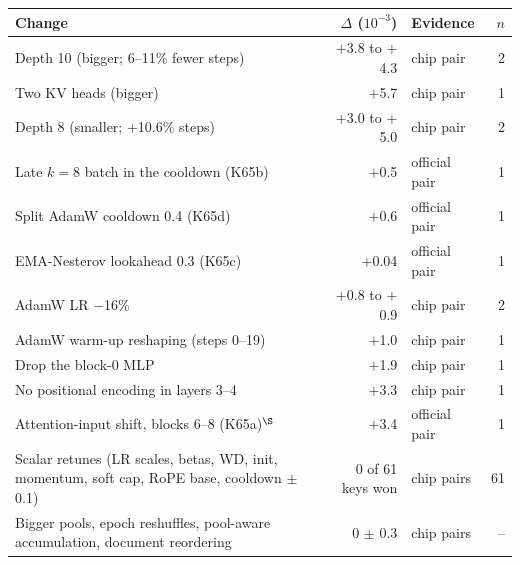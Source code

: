 {\small
\begin{tabular}{@{}p{7.6cm}rlr@{}}
\toprule
Change & $\Delta$ ($10^{-3}$) & Evidence & $n$ \\
\midrule
Depth 10 (bigger; 6--11\% fewer steps) & \ensuremath{+}3.8 to \ensuremath{+}4.3 & chip pair & 2 \\
Two KV heads (bigger) & \ensuremath{+}5.7 & chip pair & 1 \\
Depth 8 (smaller; +10.6\% steps) & \ensuremath{+}3.0 to \ensuremath{+}5.0 & chip pair & 2 \\
Late $k{=}8$ batch in the cooldown (K65b) & \ensuremath{+}0.5 & official pair & 1 \\
Split AdamW cooldown 0.4 (K65d) & \ensuremath{+}0.6 & official pair & 1 \\
EMA-Nesterov lookahead 0.3 (K65c) & \ensuremath{+}0.04 & official pair & 1 \\
AdamW LR $-$16\% & \ensuremath{+}0.8 to \ensuremath{+}0.9 & chip pair & 2 \\
AdamW warm-up reshaping (steps 0--19) & \ensuremath{+}1.0 & chip pair & 1 \\
Drop the block-0 MLP & \ensuremath{+}1.9 & chip pair & 1 \\
No positional encoding in layers 3--4 & \ensuremath{+}3.3 & chip pair & 1 \\
Attention-input shift, blocks 6--8 (K65a)$^{\S}$ & \ensuremath{+}3.4 & official pair & 1 \\
Scalar retunes (LR scales, betas, WD, init, momentum, soft cap, RoPE base, cooldown $\pm$0.1) & 0 of 61 keys won & chip pairs & 61 \\
Bigger pools, epoch reshuffles, pool-aware accumulation, document reordering & 0 $\pm$ 0.3 & chip pairs & -- \\
\bottomrule
\end{tabular}
}
